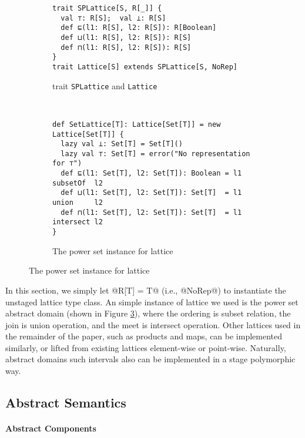 \begin{figure}[h!]
  \centering
  \begin{subfigure}[b]{0.45\textwidth}
  \begin{lstlisting}[style=small]
trait SPLattice[S, R[_]] {
  val ⊤: R[S];  val ⊥: R[S]
  def ⊑(l1: R[S], l2: R[S]): R[Boolean]
  def ⊔(l1: R[S], l2: R[S]): R[S]
  def ⊓(l1: R[S], l2: R[S]): R[S]
}
trait Lattice[S] extends SPLattice[S, NoRep]
  \end{lstlisting}
  \caption{trait \texttt{SPLattice} and \texttt{Lattice}} \label{fig:splattice}
  \end{subfigure}
  ~
  \begin{subfigure}[b]{0.6\textwidth}
\begin{lstlisting}[style=small]
def SetLattice[T]: Lattice[Set[T]] = new Lattice[Set[T]] {
  lazy val ⊥: Set[T] = Set[T]()
  lazy val ⊤: Set[T] = error("No representation for ⊤")
  def ⊑(l1: Set[T], l2: Set[T]): Boolean = l1 subsetOf  l2
  def ⊔(l1: Set[T], l2: Set[T]): Set[T]  = l1 union     l2
  def ⊓(l1: Set[T], l2: Set[T]): Set[T]  = l1 intersect l2
}
\end{lstlisting}
  \caption{The power set instance for lattice} \label{fig:powerset}
\end{subfigure}
\end{figure}

In this section, we simply let @R[T] = T@ (i.e., @NoRep@) to instantiate the
unstaged lattice type class. An simple instance of lattice we used is the power
set abstract domain (shown in Figure \ref{fig:powerset}), where the ordering is subset relation, the join is union
operation, and the meet is intersect operation.
Other lattices used in the remainder of the paper, such as products and maps, can be
implemented similarly, or lifted from existing lattices element-wise or
point-wise. Naturally, abstract domains such intervals also can be implemented
in a stage polymorphic way.

\subsection{Abstract Semantics}

\paragraph{Abstract Components}


